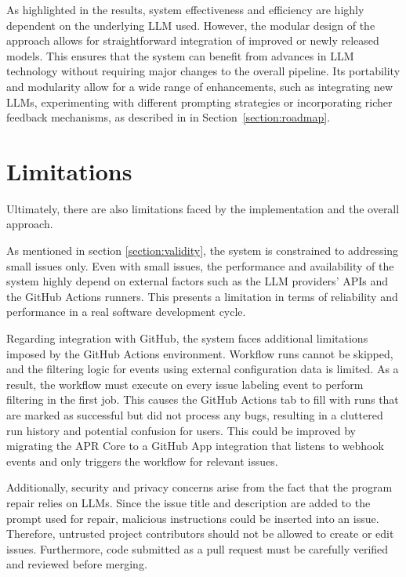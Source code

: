 As highlighted in the results, system effectiveness and efficiency are highly dependent on the underlying \ac{LLM} used. However, the modular design of the approach allows for straightforward integration of improved or newly released models. This ensures that the system can benefit from advances in \ac{LLM} technology without requiring major changes to the overall pipeline. Its portability and modularity allow for a wide range of enhancements, such as integrating new \acp{LLM}, experimenting with different prompting strategies or incorporating richer feedback mechanisms, as described in in Section~\ref{section:roadmap}.

\section{Limitations}
Ultimately, there are also limitations faced by the implementation and the overall approach.

As mentioned in section \ref{section:validity}, the system is constrained to addressing small issues only. Even with small issues, the performance and availability of the system highly depend on external factors such as the \ac{LLM} providers' \acp{API} and the GitHub Actions runners. This presents a limitation in terms of reliability and performance in a real software development cycle.

Regarding integration with GitHub, the system faces additional limitations imposed by the GitHub Actions environment. Workflow runs cannot be skipped, and the filtering logic for events using external configuration data is limited. As a result, the workflow must execute on every issue labeling event to perform filtering in the first job. This causes the GitHub Actions tab to fill with runs that are marked as successful but did not process any bugs, resulting in a cluttered run history and potential confusion for users. This could be improved by migrating the APR Core to a GitHub App integration that listens to webhook events and only triggers the workflow for relevant issues.

Additionally, security and privacy concerns arise from the fact that the program repair relies on \acp{LLM}. Since the issue title and description are added to the prompt used for repair, malicious instructions could be inserted into an issue. Therefore, untrusted project contributors should not be allowed to create or edit issues. Furthermore, code submitted as a pull request must be carefully verified and reviewed before merging.

